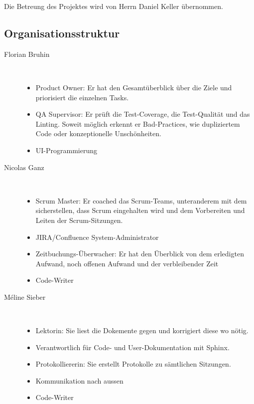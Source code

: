 \documentclass[a4paper]{article}
\begin{document}
Die Betreung des Projektes wird von Herrn Daniel Keller übernommen.

\subsection{Organisationsstruktur}
\begin{description}

\item[Florian Bruhin] \strut \\[-1em]
  \begin{itemize}
    \item Product Owner: Er hat den Gesamtüberblick über die Ziele und priorisiert die einzelnen Tasks.
    \item QA Supervisor: Er prüft die Test-Coverage, die Test-Qualität und das Linting. Soweit möglich erkennt er Bad-Practices, wie dupliziertem Code oder konzeptionelle Unschönheiten.
    \item UI-Programmierung
  \end{itemize}
\item[Nicolas Ganz] \strut \\[-1em]
  \begin{itemize}
    \item Scrum Master: Er coached das Scrum-Teams, unteranderem mit dem sicherstellen, dass Scrum eingehalten wird und dem Vorbereiten und Leiten der Scrum-Sitzungen.
    \item JIRA/Confluence System-Administrator
    \item Zeitbuchungs-Überwacher: Er hat den Überblick von dem erledigten Aufwand, noch offenen Aufwand und der verbleibender Zeit
    \item Code-Writer
  \end{itemize}
\item[Méline Sieber] \strut \\[-1em]
  \begin{itemize}
    \item Lektorin: Sie liest die Dokemente gegen und korrigiert diese wo nötig.
    \item Verantwortlich für Code- und User-Dokumentation mit Sphinx.
    \item Protokolliererin: Sie erstellt Protokolle zu sämtlichen Sitzungen.
    \item Kommunikation nach aussen
    \item Code-Writer
  \end{itemize}
\end{description}
\end{document}
